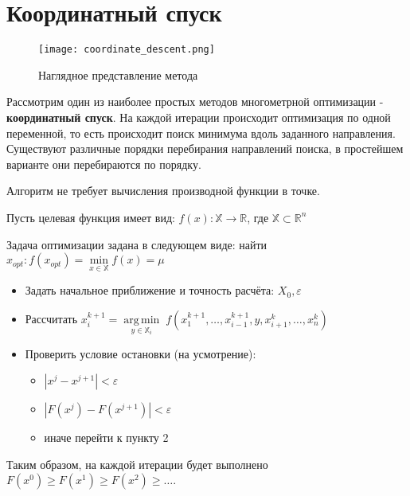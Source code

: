 \section{Координатный спуск}

\begin{wrapfigure}{r}{0.25\textwidth}
\texttt{[image: coordinate\_descent.png]} 
\caption{Наглядное представление метода}
\label{fig:wrapfig}
\end{wrapfigure}

Рассмотрим один из наиболее простых методов многометрной оптимизации - \textbf{координатный спуск}. На каждой итерации происходит оптимизация по одной переменной, то есть происходит поиск минимума вдоль заданного направления.
Существуют различные порядки перебирания направлений поиска, в простейшем варианте они перебираются по порядку.\\

\begin{remark*}
Алгоритм не требует вычисления производной функции в точке.\\
\end{remark*}

\begin{algo*}
Пусть целевая функция имеет вид:
$f(x): \mathbb{X} \rightarrow \mathbb{R}$, где $\mathbb{X} \subset \mathbb{R}^n$

Задача оптимизации задана в следующем виде:
найти $x_{opt}:f(x_{opt}) = \min\limits_{x\in \mathbb{X}}f(x) = \mu$
\end{algo*}

\begin{itemize}
    \item Задать начальное приближение и точность расчёта: $X_0, \varepsilon$
    \item Рассчитать ${\displaystyle x_{i}^{k+1}={\underset {y\in \mathbb{X}_i }{\operatorname {arg\,min} }}\;f(x_{1}^{k+1},\dots ,x_{i-1}^{k+1},y,x_{i+1}^{k},\dots ,x_{n}^{k})}$
    \item Проверить условие остановки (на усмотрение):
    \begin{itemize}
        \item $|x^{j}-x^{j+1}|<\varepsilon$
        \item $|F(x^{j})-F(x^{j+1})|<\varepsilon$
        \item иначе перейти к пункту 2
    \end{itemize}
\end{itemize}

Таким образом, на каждой итерации будет выполнено
${\displaystyle F({x} ^{0})\geqslant F({x} ^{1})\geqslant F({x} ^{2})\geqslant \dots .}$\\

